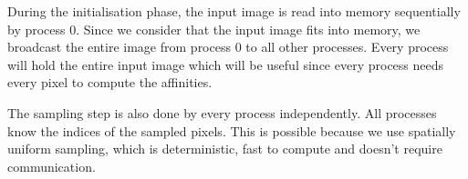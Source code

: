 During the initialisation phase, the input image is read into memory sequentially by process 0.
Since we consider that the input image fits into memory, we broadcast the entire image from process 0 to all other processes.
Every process will hold the entire input image which will be useful since every process needs every pixel to compute the affinities.

The sampling step is also done by every process independently.
All processes know the indices of the sampled pixels.
This is possible because we use spatially uniform sampling, which is deterministic, fast to compute and doesn't require communication.
